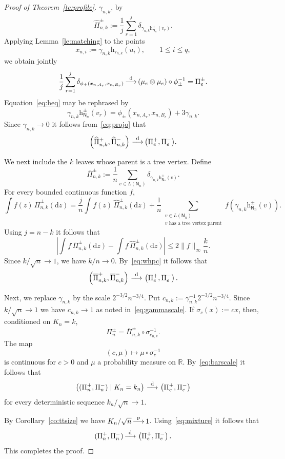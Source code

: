 \documentclass[english,11pt]{smfart}
\newcommand{\ndR}{\mathbb{R}}
\newcommand{\convdis}{\,{\buildrel \mathrm{d} \over \longrightarrow}\,}
\newcommand{\convp}{\,{\buildrel \mathrm{p} \over \longrightarrow}\,}
\newcommand{\he}{\mathrm{h}}
\newcommand{\mN}{\mathsf{N}}
\numberwithin{equation}{section}
\begin{document}
\begin{proof}[Proof of Theorem~\ref{te:profile}]
	$\gamma_{n,k}$, by
	\[
		\widehat{\Pi}_{n,k}^{\pm} := \frac{1}{j}\sum_{r=1}^{j} \delta_{\gamma_{n,k}\he_{\mN_n}^{\pm}(v_r)}.
	\]
	Applying Lemma~\ref{le:matching} to the points
	\[
		x_{n,i} := \gamma_{n,k} \he_{\tau_{n,k}}(u_i), \qquad 1 \le i \le q,
	\]
	we obtain jointly
	\begin{align}
		\label{eq:projo}
		\frac{1}{j}\sum_{r=1}^{j} \delta_{\phi_\pm(x_{n,A_r},x_{n,B_r})} \convdis (\mu_e\otimes\mu_e)\circ\phi_\pm^{-1} = \Pi_e^\pm.
	\end{align}
	Equation~\eqref{eq:heq} may be rephrased by
	\[
		\gamma_{n,k} \he_{\mN_n}^{\pm}(v_r) = \phi_\pm(x_{n,A_r}, x_{n,B_r}) + 3\gamma_{n,k}.
	\]
	Since $\gamma_{n,k} \to 0$ it follows from~\eqref{eq:projo} that
	\begin{align}
		\label{eq:whpc}
		\left(\widehat{\Pi}_{n,k}^+, \widehat{\Pi}_{n,k}^-\right) \convdis \bigl(\Pi_e^+,\Pi_e^-\bigr).
	\end{align}
	

	
	We next include the $k$ leaves whose parent is a tree vertex. Define
	\[
		\overline{\Pi}_{n,k}^{\pm} := \frac{1}{n}\sum_{v\in L(\mN_n)} \delta_{\gamma_{n,k}\he_{\mN_n}^{\pm}(v)}.
	\]
	For every bounded continuous function $f$,
	\[
		\int f(z)\, \overline{\Pi}_{n,k}^{\pm}(\mathrm{d}z) = \frac{j}{n}\int f(z)\,\widehat{\Pi}_{n,k}^{\pm}(\mathrm{d}z) + \frac{1}{n} \sum_{\substack{v\in L(\mN_n)\\
			v\text{ has a tree vertex parent}}} f\left( \gamma_{n,k} \he_{\mN_n}^{\pm}(v) \right).
	\]
	Using $j=n-k$ it follows that
	\[
		\left| \int f\,\overline{\Pi}_{n,k}^{\pm}(\mathrm{d}z) - \int f\,\widehat{\Pi}_{n,k}^{\pm}(\mathrm{d}z) \right| \le 2 \|f\|_\infty\frac{k}{n}.
	\]
	Since $k/\sqrt{n} \to 1$, we have $k/n \to 0$. By~\eqref{eq:whpc} it follows that
	\begin{align}
		\label{eq:barscale}
		\left(\overline{\Pi}_{n,k}^+,\overline{\Pi}_{n,k}^-\right) \convdis \left(\Pi_e^+,\Pi_e^-\right).
	\end{align}
	
	Next, we replace $\gamma_{n,k}$ by the scale $2^{-3/2}n^{-3/4}$. Put $c_{n,k}:= \gamma_{n,k}^{-1} 2^{-3/2}n^{-3/4}$. Since $k / \sqrt{n} \to 1$ we have $c_{n,k} \to 1$ as noted in~\eqref{eq:gammascale}. If $\sigma_c(x):=cx$, then, conditioned on
	$K_n=k$,
	\[
		\Pi_n^\pm = \overline{\Pi}_{n,k}^{\pm}\circ\sigma_{c_{n,k}}^{-1}.
	\]
	The map
	\[
		(c,\mu) \mapsto \mu\circ\sigma_c^{-1}
	\]
	is continuous for $c>0$ and $\mu$ a probability measure on $\ndR$. By~\eqref{eq:barscale} it follows that
	\begin{align}
		\label{eq:mixture}
		\left((\Pi_n^+,\Pi_n^-) \mid K_n=k_n \right) \convdis \left(\Pi_e^+,\Pi_e^-\right)
	\end{align}
	for every deterministic sequence $k_n/\sqrt n\to1$. 
	
	By Corollary~\ref{co:ttsize}  we have $K_n / \sqrt{n} \convp 1$. Using~\eqref{eq:mixture} it follows that
	\begin{align*}
		(\Pi_n^+,\Pi_n^-)  \convdis \left(\Pi_e^+,\Pi_e^-\right).
	\end{align*}
	This completes the proof.
\end{proof}
\end{document}
